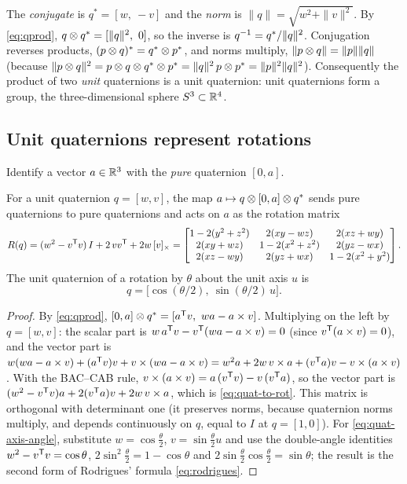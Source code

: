 The \emph{conjugate} is $q^* = [w,\ -v]$ and the \emph{norm} is $\|q\| = \sqrt{w^2 + \|v\|^2}$. By \eqref{eq:qprod}, $q\otimes q^* = [\|q\|^2,\ 0]$, so the
inverse is $q^{-1} = q^*/\|q\|^2$. Conjugation reverses products, $(p\otimes q)^* = q^*\otimes p^*$, and norms multiply, $\|p\otimes q\| = \|p\|\|q\|$
(because $\|p\otimes q\|^2 = p\otimes q\otimes q^*\otimes p^* = \|q\|^2\,p\otimes p^* = \|p\|^2\|q\|^2$). Consequently the product of two \emph{unit}
quaternions is a unit quaternion: unit quaternions form a group, the three-dimensional sphere $S^3 \subset \mathbb{R}^4$.

\subsection{Unit quaternions represent rotations}

Identify a vector $a \in \mathbb{R}^3$ with the \emph{pure} quaternion $[0, a]$.

\begin{theorem}
\label{thm:quat-rotation}
For a unit quaternion $q = [w, v]$, the map $a \mapsto q\otimes[0, a]\otimes q^*$ sends pure quaternions to pure quaternions and acts on $a$ as the rotation
matrix
\begin{equation}
  R(q) = (w^2 - v^{\mathsf{T}} v)\,I + 2\,v v^{\mathsf{T}} + 2w\,[v]_{\times}
  = \begin{bmatrix}
    1 - 2(y^2 + z^2) & 2(xy - wz) & 2(xz + wy) \\
    2(xy + wz) & 1 - 2(x^2 + z^2) & 2(yz - wx) \\
    2(xz - wy) & 2(yz + wx) & 1 - 2(x^2 + y^2)
  \end{bmatrix}.
  \label{eq:quat-to-rot}
\end{equation}
The unit quaternion of a rotation by $\theta$ about the unit axis $u$ is
\begin{equation}
  q = \big[\cos(\theta/2),\ \sin(\theta/2)\,u\big].
  \label{eq:quat-axis-angle}
\end{equation}
\end{theorem}
\begin{proof}
By \eqref{eq:qprod}, $[0, a]\otimes q^* = [a^{\mathsf{T}} v,\ wa - a\times v]$. Multiplying on the left by $q = [w, v]$:
the scalar part is $w\,a^{\mathsf{T}} v - v^{\mathsf{T}}(wa - a\times v) = 0$ (since $v^{\mathsf{T}}(a\times v) = 0$), and the vector part is
$w(wa - a\times v) + (a^{\mathsf{T}} v)v + v\times(wa - a\times v) = w^2a + 2w\,v\times a + (v^{\mathsf{T}} a)v - v\times(a\times v)$. With the BAC--CAB rule,
$v\times(a\times v) = a\,(v^{\mathsf{T}} v) - v\,(v^{\mathsf{T}} a)$, so the vector part is $(w^2 - v^{\mathsf{T}} v)a + 2(v^{\mathsf{T}} a)v + 2w\,v\times a$, which is \eqref{eq:quat-to-rot}. This
matrix is orthogonal with determinant one (it preserves norms, because quaternion norms multiply, and depends continuously on $q$, equal to
$I$ at $q = [1, 0]$). For \eqref{eq:quat-axis-angle}, substitute $w = \cos\frac\theta2$, $v = \sin\frac\theta2 u$ and use the double-angle identities
$w^2 - v^{\mathsf{T}} v = \cos\theta$, $2\sin^2\frac\theta2 = 1 - \cos\theta$ and $2\sin\frac\theta2\cos\frac\theta2 = \sin\theta$; the result is the second form of
Rodrigues' formula \eqref{eq:rodrigues}.
\end{proof}

